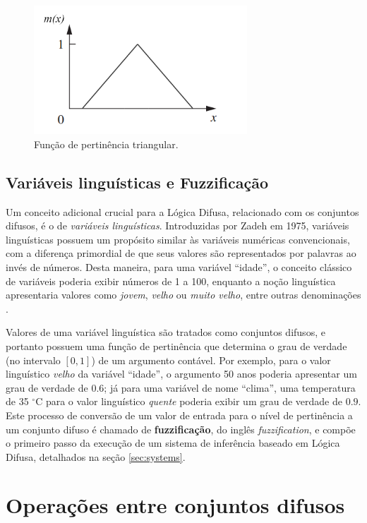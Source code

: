 \documentclass[12pt]{article}
\begin{document}
\begin{figure}[ht]
    \centering
    \includegraphics[width=8cm]{membership.png}
    \caption{Função de pertinência triangular.}
    \label{fig:membership}
\end{figure}

\subsection{Variáveis linguísticas e Fuzzificação} \label{sec:linguisticvars}

Um conceito adicional crucial para a Lógica Difusa, relacionado com os conjuntos difusos, é o de \textit{variáveis linguísticas}. Introduzidas por Zadeh em 1975, variáveis linguísticas possuem um propósito similar às variáveis numéricas convencionais, com a diferença primordial de que seus valores são representados por palavras ao invés de números. Desta maneira, para uma variável ``idade'', o conceito clássico de variáveis poderia exibir números de 1 a 100, enquanto a noção linguística apresentaria valores como \textit{jovem}, \textit{velho} ou \textit{muito velho}, entre outras denominações \cite{Zadeh1975}.

Valores de uma variável linguística são tratados como conjuntos difusos, e portanto possuem uma função de pertinência que determina o grau de verdade (no intervalo $[0, 1]$) de um argumento contável. Por exemplo, para o valor linguístico \textit{velho} da variável ``idade'', o argumento 50 anos poderia apresentar um grau de verdade de $0.6$; já para uma variável de nome ``clima'', uma temperatura de 35 $^{\circ}$C para o valor linguístico \textit{quente} poderia exibir um grau de verdade de $0.9$. Este processo de conversão de um valor de entrada para o nível de pertinência a um conjunto difuso é chamado de \textbf{fuzzificação}, do inglês \textit{fuzzification}, e compõe o primeiro passo da execução de um sistema de inferência baseado em Lógica Difusa, detalhados na seção \ref{sec:systems}.

\section{Operações entre conjuntos difusos} \label{sec:fuzzyoperations}
\end{document}
